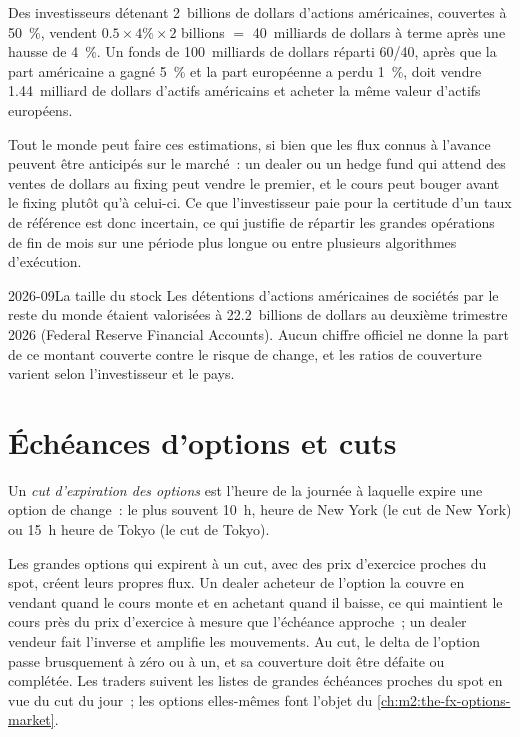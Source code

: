 \begin{example}\label{ex:m2:fixings-and-flows:flows}
Des investisseurs détenant 2~billions de dollars d'actions américaines, couvertes à 50~\%, vendent
$0.5 \times 4\% \times 2$ billions $=$ 40~milliards de dollars à terme après une hausse de 4~\%. Un
fonds de 100~milliards de dollars réparti 60/40, après que la part américaine a gagné 5~\% et la
part européenne a perdu 1~\%, doit vendre 1.44~milliard de dollars d'actifs américains et acheter
la même valeur d'actifs européens.
\end{example}

Tout le monde peut faire ces estimations, si bien que les flux connus à l'avance peuvent être
anticipés sur le marché~: un dealer ou un hedge fund qui attend des ventes de dollars au fixing
peut vendre le premier, et le cours peut bouger avant le fixing plutôt qu'à celui-ci. Ce que
l'investisseur paie pour la certitude d'un taux de référence est donc incertain, ce
qui justifie de répartir les grandes opérations de fin de mois sur une période plus longue ou
entre plusieurs algorithmes d'exécution.

\begin{dated}{2026-09}{La taille du stock}\label{dat:m2:fixings-and-flows:size}
Les détentions d'actions américaines de sociétés par le reste du monde étaient valorisées à
22.2~billions de dollars au deuxième trimestre 2026 (Federal Reserve Financial
Accounts). Aucun chiffre officiel ne donne la part de ce montant couverte contre le risque de change,
et les ratios de couverture varient selon l'investisseur et le pays.
\end{dated}

\section{Échéances d'options et cuts}

\begin{definition}\label{def:m2:fixings-and-flows:cut}
Un \emph{cut d'expiration des options} est l'heure de la journée à laquelle
expire une option de change~: le plus souvent 10~h, heure de New York (le cut de New York) ou 15~h
heure de Tokyo (le cut de Tokyo).
\end{definition}

Les grandes options qui expirent à un cut, avec des prix d'exercice proches du spot,
créent leurs propres flux. Un dealer acheteur de l'option la couvre en vendant quand le cours monte et en achetant
quand il baisse, ce qui maintient le cours près du prix d'exercice à mesure que l'échéance approche~; un dealer vendeur
fait l'inverse et amplifie les mouvements. Au cut, le delta de l'option passe brusquement à zéro ou
à un, et sa couverture doit être défaite ou complétée. Les traders suivent les listes de
grandes échéances proches du spot en vue du cut du jour~; les options elles-mêmes font l'objet du
\cref{ch:m2:the-fx-options-market}.

